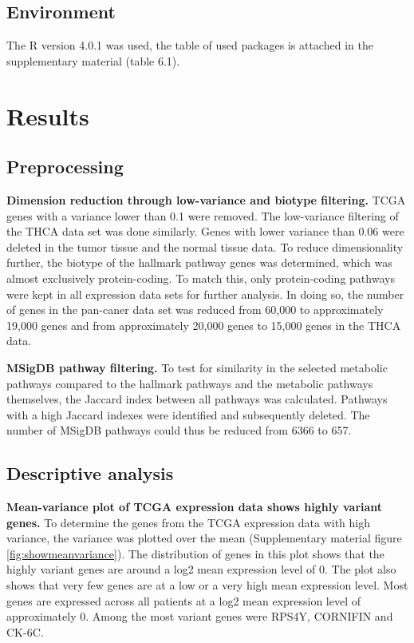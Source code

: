 \documentclass[
  11pt,
  parskip,
  oneside]{scrreprt}
\begin{document}
\hypertarget{environment}{%
\section{Environment}\label{environment}}

The R version 4.0.1 was used, the table of used packages is attached in
the supplementary material (table 6.1).

\hypertarget{results}{%
\chapter{Results}\label{results}}

\hypertarget{preprocessing}{%
\section{Preprocessing}\label{preprocessing}}

\textbf{Dimension reduction through low-variance and biotype filtering.}
TCGA genes with a variance lower than 0.1 were removed. The low-variance
filtering of the THCA data set was done similarly. Genes with lower
variance than 0.06 were deleted in the tumor tissue and the normal
tissue data. To reduce dimensionality further, the biotype of the
hallmark pathway genes was determined, which was almost exclusively
protein-coding. To match this, only protein-coding pathways were kept in
all expression data sets for further analysis. In doing so, the number
of genes in the pan-caner data set was reduced from 60,000 to
approximately 19,000 genes and from approximately 20,000 genes to 15,000
genes in the THCA data.

\textbf{MSigDB pathway filtering.} To test for similarity in the
selected metabolic pathways compared to the hallmark pathways and the
metabolic pathways themselves, the Jaccard index between all pathways
was calculated. Pathways with a high Jaccard indexes were identified and
subsequently deleted. The number of MSigDB pathways could thus be
reduced from 6366 to 657.

\hypertarget{descriptive-analysis}{%
\section{Descriptive analysis}\label{descriptive-analysis}}

\textbf{Mean-variance plot of TCGA expression data shows highly variant
genes.} To determine the genes from the TCGA expression data with high
variance, the variance was plotted over the mean (Supplementary material
figure \ref{fig:showmeanvariance}). The distribution of genes in this
plot shows that the highly variant genes are around a log2 mean
expression level of 0. The plot also shows that very few genes are at a
low or a very high mean expression level. Most genes are expressed
across all patients at a log2 mean expression level of approximately 0.
Among the most variant genes were RPS4Y, CORNIFIN and CK-6C.
\end{document}
